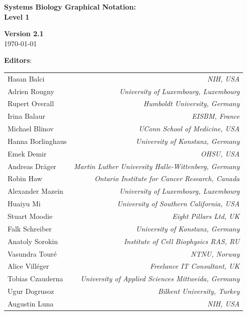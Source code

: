\begin{titlepage}

\vspace*{0.75in}

\begin{center}

\textbf{\sffamily\bfseries\huge
Systems Biology Graphical Notation:\\[0.3em]
\PDl Level 1}

\vspace*{0.5in}

\Large
\textbf{Version 2.1}\\[0.1in]

\large
\today\\[0.25in]

\vspace{0.5in}

\textbf{\sffamily Editors}:\\[7pt]

\begin{tabular}{l>{\hspace*{15pt}}r}
Hasan Balci   & \emph{NIH, USA}\\
Adrien Rougny   & \emph{University of Luxembourg, Luxembourg}\\
Rupert Overall   & \emph{Humboldt University, Germany}\\
Irina Balaur & \emph{EISBM, France}\\
Michael Blinov & \emph{UConn School of Medicine, USA}\\
Hanna Borlinghaus & \emph{University of Konstanz, Germany}\\
Emek Demir    & \emph{OHSU, USA}\\
Andreas Dräger   & \emph{Martin Luther University Halle-Wittenberg, Germany}\\
Robin Haw   & \emph{Ontario Institute for Cancer Research, Canada}\\
Alexander Mazein   & \emph{University of Luxembourg, Luxembourg}\\
Huaiyu Mi	& \emph{University of Southern California, USA}\\
Stuart Moodie   & \emph{Eight Pillars Ltd, UK}\\
Falk Schreiber	 & \emph{University of Konstanz, Germany}\\
Anatoly Sorokin   & \emph{Institute of Cell Biophysics RAS, RU}\\ 
Vasundra Touré   & \emph{NTNU, Norway}\\
Alice Vill\'{e}ger   & \emph{Freelance IT Consultant, UK}\\
Tobias Czauderna   & \emph{University of Applied Sciences Mittweida, Germany}\\
Ugur Dogrusoz   & \emph{Bilkent University, Turkey}\\
Augustin Luna   & \emph{NIH, USA}\\
\end{tabular}


\end{center}
\end{titlepage}
